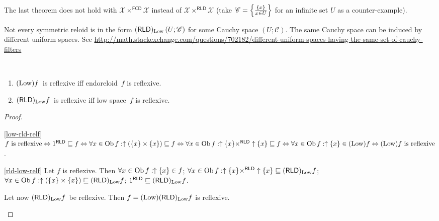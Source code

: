 \begin{rem}
  The last theorem does not hold with $\mathcal{X}
  \times^{\mathsf{FCD}} \mathcal{X}$ instead of $\mathcal{X}
  \times^{\mathsf{RLD}} \mathcal{X}$ (take $\mathscr{C} = \left\{ \frac{ \{ x
  \} }{x \in U}\right\}$ for an infinite set $U$ as a counter-example).
\end{rem}

\begin{rem}
  Not every symmetric reloid is in the form
  $(\mathsf{RLD})_{\operatorname{Low}} \left( U ; \mathscr{C} \right)$ for some
  Cauchy space $\left( U ; \mathscr{C} \right)$. The same Cauchy space can be
  induced by different uniform spaces. See
  \url{http://math.stackexchange.com/questions/702182/different-uniform-spaces-having-the-same-set-of-cauchy-filters}
\end{rem}

\begin{prop}
~
\begin{enumerate}
\item \label{low-rld-relf}$(\operatorname{Low})f$~is reflexive iff endoreloid~$f$ is reflexive.
\item \label{rld-low-relf}$(\mathsf{RLD})_{\operatorname{Low}}f$~is reflexive iff low space~$f$ is reflexive.
\end{enumerate}
\end{prop}

\begin{proof}
~
\begin{widedisorder}
\item[\ref{low-rld-relf}] $\text{$f$ is reflexive} \Leftrightarrow
  1^{\mathsf{RLD}}\sqsubseteq f  \Leftrightarrow \forall x\in\operatorname{Ob} f:\uparrow(\{x\}\times\{x\})\sqsubseteq f \Leftrightarrow
  \forall x\in\operatorname{Ob} f:\uparrow\{x\}\times^{\mathsf{RLD}}\uparrow\{x\}\sqsubseteq f \Leftrightarrow
  \forall x\in\operatorname{Ob} f:\uparrow\{x\}\in(\operatorname{Low})f \Leftrightarrow \text{$(\operatorname{Low})f$~is reflexive}$.

\item[\ref{rld-low-relf}] Let $f$ is reflexive. Then $\forall x\in\operatorname{Ob} f:\uparrow\{x\}\in f$;
  $\forall x\in\operatorname{Ob} f:\uparrow\{x\}\times^{\mathsf{RLD}}\uparrow\{x\}\sqsubseteq(\mathsf{RLD})_{\operatorname{Low}}f$;
  $\forall x\in\operatorname{Ob} f:\uparrow(\{x\}\times\{x\})\sqsubseteq(\mathsf{RLD})_{\operatorname{Low}}f$;
  $1^{\mathsf{RLD}}\sqsubseteq(\mathsf{RLD})_{\operatorname{Low}}f$.
  
  Let now $(\mathsf{RLD})_{\operatorname{Low}}f$~be reflexive. Then $f = (\operatorname{Low})(\mathsf{RLD})_{\operatorname{Low}}f$ is reflexive.
\end{widedisorder}
\end{proof}

